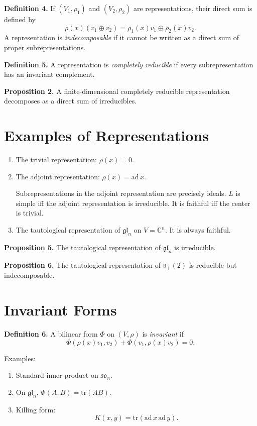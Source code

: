 \textbf{Definition 4.}
If $(V_1,\rho_1)$ and $(V_2,\rho_2)$ are representations,
their direct sum is defined by
\[
\rho(x)(v_1 \oplus v_2) = \rho_1(x)v_1 \oplus \rho_2(x)v_2.
\]
A representation is \emph{indecomposable} if it cannot be written as a direct sum of proper subrepresentations.

\textbf{Definition 5.}
A representation is \emph{completely reducible} if every subrepresentation has an invariant complement.

\textbf{Proposition 2.}
A finite-dimensional completely reducible representation decomposes as a direct sum of irreducibles.

\section*{Examples of Representations}

\begin{enumerate}
\item The trivial representation: $\rho(x)=0$.

\item The adjoint representation: $\rho(x)=\mathrm{ad}\,x$.

Subrepresentations in the adjoint representation are precisely ideals.
$L$ is simple iff the adjoint representation is irreducible.
It is faithful iff the center is trivial.

\item The tautological representation of $\mathfrak{gl}_n$ on $V=\mathbb{C}^n$.
It is always faithful.
\end{enumerate}

\textbf{Proposition 5.}
The tautological representation of $\mathfrak{gl}_n$ is irreducible.

\textbf{Proposition 6.}
The tautological representation of $\mathfrak{n}_+(2)$ is reducible but indecomposable.

\section*{Invariant Forms}

\textbf{Definition 6.}
A bilinear form $\Phi$ on $(V,\rho)$ is \emph{invariant} if
\[
\Phi(\rho(x)v_1,v_2)+\Phi(v_1,\rho(x)v_2)=0.
\]

Examples:

\begin{enumerate}
\item Standard inner product on $\mathfrak{so}_n$.
\item On $\mathfrak{gl}_n$, $\Phi(A,B)=\mathrm{tr}(AB)$.
\item Killing form:
\[
K(x,y)=\mathrm{tr}(\mathrm{ad}\,x\,\mathrm{ad}\,y).
\]
\end{enumerate}

